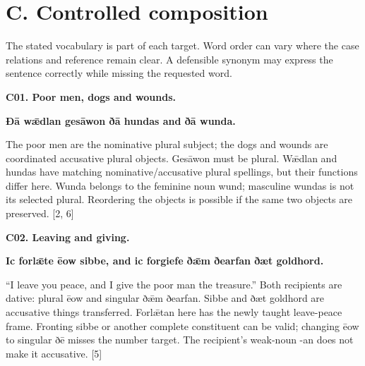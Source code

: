 \section*{C. Controlled composition}

The stated vocabulary is part of each target. Word order can vary where the case relations and reference remain clear. A defensible synonym may express the sentence correctly while missing the requested word.

\par\begin{minipage}{\linewidth}\raggedright
\textbf{C01. Poor men, dogs and wounds.}

\textbf{Ðā wǣdlan gesāwon ðā hundas and ðā wunda.}

The poor men are the nominative plural subject; the dogs and wounds are coordinated accusative plural objects. Gesāwon must be plural. Wǣdlan and hundas have matching nominative/\allowbreak{}accusative plural spellings, but their functions differ here. Wunda belongs to the feminine noun wund; masculine wundas is not its selected plural. Reordering the objects is possible if the same two objects are preserved. [2, 6]

\end{minipage}\par\addvspace{4pt}

\par\begin{minipage}{\linewidth}\raggedright
\textbf{C02. Leaving and giving.}

\textbf{Ic forlǣte ēow sibbe, and ic forgiefe ðǣm ðearfan ðæt goldhord.}

“I leave you peace, and I give the poor man the treasure.” Both recipients are dative: plural ēow and singular ðǣm ðearfan. Sibbe and ðæt goldhord are accusative things transferred. Forlǣtan here has the newly taught leave-peace frame. Fronting sibbe or another complete constituent can be valid; changing ēow to singular ðē misses the number target. The recipient's weak-noun -an does not make it accusative. [5]

\end{minipage}\par\addvspace{4pt}

